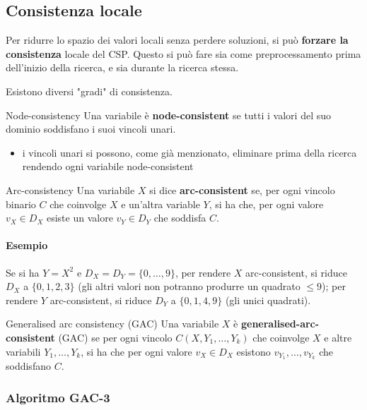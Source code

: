 \documentclass[a4paper,11pt]{report}
\begin{document}
\subsection{Consistenza locale}
Per ridurre lo spazio dei valori locali senza perdere soluzioni, si può \textbf{forzare la consistenza} locale del CSP. Questo si può fare sia come preprocessamento prima dell'inizio della ricerca, e sia durante la ricerca stessa.

Esistono diversi "gradi" di consistenza.

\begin{defframe}{Node-consistency}{}
    Una variabile è \textbf{node-consistent} se tutti i valori del suo dominio soddisfano i suoi vincoli unari.
\end{defframe}
\begin{itemize}
    \item i vincoli unari si possono, come già menzionato, eliminare prima della ricerca rendendo ogni variabile node-consistent
\end{itemize}

\begin{defframe}{Arc-consistency}{}
    Una variabile $X$ si dice \textbf{arc-consistent} se, per ogni vincolo binario $C$ che coinvolge $X$ e un'altra variable $Y$, si ha che, per ogni valore $v_X \in D_X$ esiste un valore $v_Y \in D_Y$ che soddisfa $C$.
\end{defframe}

\paragraph{Esempio}
Se si ha $Y=X^2$ e $D_X=D_Y=\{0,\dots, 9\}$, per rendere $X$ arc-consistent, si riduce $D_X$ a $\{0,1,2,3\}$ (gli altri valori non potranno produrre un quadrato $\leq 9$); per rendere $Y$ arc-consistent, si riduce $D_Y$ a $\{0,1,4,9\}$ (gli unici quadrati).

\begin{defframe}{Generalised arc consistency (GAC)}{}
    Una variabile $X$ è \textbf{generalised-arc-consistent} (GAC) se per ogni vincolo $C(X, Y_1, \dots, Y_k)$ che coinvolge $X$ e altre variabili $Y_1, \dots, Y_k$, si ha che per ogni valore $v_X \in D_X$ esistono $v_{Y_1}, \dots, v_{Y_k}$ che soddisfano $C$.
\end{defframe}

\subsubsection{Algoritmo GAC-3}
\end{document}
